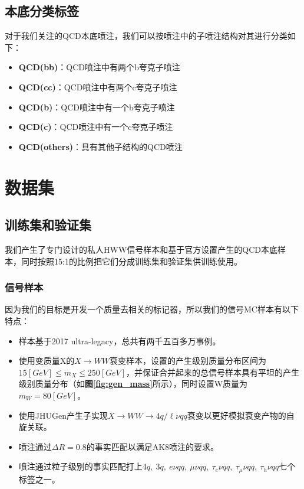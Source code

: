 \subsection{本底分类标签}
对于我们关注的QCD本底喷注，我们可以按喷注中的子喷注结构对其进行分类如下：
\begin{itemize}\label{eq:5.2}
    \item \textbf{QCD(bb)}：QCD喷注中有两个b夸克子喷注
    \item \textbf{QCD(cc)}：QCD喷注中有两个c夸克子喷注
    \item \textbf{QCD(b)}：QCD喷注中有一个b夸克子喷注
    \item \textbf{QCD(c)}：QCD喷注中有一个c夸克子喷注
    \item \textbf{QCD(others)}：具有其他子结构的QCD喷注
\end{itemize}

\section{数据集}
\subsection{训练集和验证集}
我们产生了专门设计的私人HWW信号样本和基于官方设置产生的QCD本底样本，同时按照15:1的比例把它们分成训练集和验证集供训练使用。
\subsubsection{信号样本}
因为我们的目标是开发一个质量去相关的标记器，所以我们的信号MC样本有以下特点：
\begin{itemize}
    \item 样本基于2017 ultra-legacy，总共有两千五百多万事例。
    \item 使用变质量X的$X\to WW$衰变样本，设置的产生级别质量分布区间为$15 [\si{GeV}]\leq m_X\leq 250[\si{GeV}]$，并保证合并起来的总信号样本具有平坦的产生级别质量分布（如\textbf{图\ref{fig:gen_mass}}所示），同时设置W质量为$m_W=80[\si{GeV}]$。
    \item 使用JHUGen产生子实现$X\to WW\to4q/\ell \nu qq$衰变以更好模拟衰变产物的自旋关联。
    \item 喷注通过$\Delta R=0.8$的事实匹配以满足AK8喷注的要求。
    \item 喷注通过粒子级别的事实匹配打上$4q,\ 3q,\ e\nu qq,\ \mu\nu qq,\ \tau_e\nu qq,\ \tau_\mu\nu qq,\ \tau_h\nu qq$七个标签之一。
\end{itemize}

